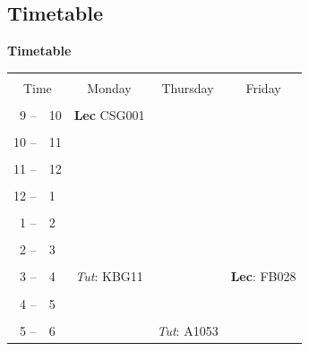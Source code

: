 \documentclass[compress]{beamer}        %
\makeatletter
\newcommand{\tcb}{\textcolor{beamer@blendedblue}}
\makeatother
\begin{document}
\subsection{Timetable}
\begin{frame}{\bf \tcb{Timetable}\\[-1cm]}

\begin{scriptsize}
\begin{center}
\begin{tabular}{|r@{\,\,}l|c|c|c|}
\hline &&&& \\[-0.2cm]
\multicolumn{2}{|c|}{Time}  & Monday  & Thursday & Friday \\[0.1cm]
\hline &&&& \\[-0.2cm]
9 --& 10 &  {\bf Lec} CSG001 & & \\[0.1cm]
\hline &&&& \\[-0.2cm]
10 --& 11 &&& \\[0.1cm]
\hline &&&& \\[-0.2cm]
11 --& 12 &&& \\[0.1cm]
\hline &&&& \\[-0.2cm]
12 --& 1 &&& \\[0.1cm]
\hline &&&& \\[-0.2cm]
1 --& 2 &&& \\[0.1cm]
\hline &&&& \\[-0.2cm]
2 --& 3 &&& \\[0.1cm]
\hline &&&& \\[-0.2cm]
3 --& 4 & {\it Tut}: KBG11 &       & {\bf Lec}: FB028 \\[0.1cm]
\hline &&&& \\[-0.2cm]
4 --& 5 &&& \\[0.1cm]
\hline &&&& \\[-0.2cm]
5 --& 6  &         &  {\it Tut}: A1053       & \\[0.1cm]
\hline
\end{tabular}
\end{center}
\end{scriptsize}
%


\end{frame}
\end{document}
